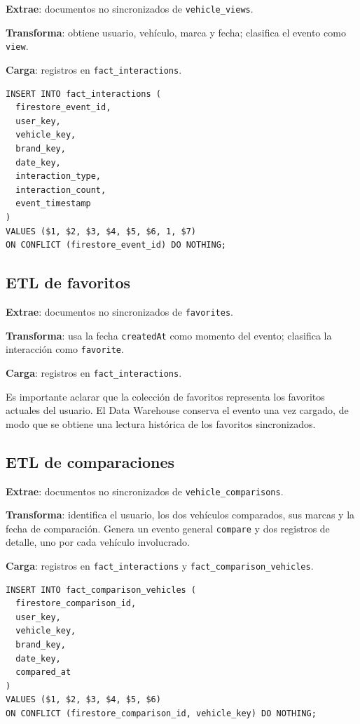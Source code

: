 \documentclass[12pt,letterpaper]{article}
\begin{document}
\textbf{Extrae}: documentos no sincronizados de \texttt{vehicle\_views}.

\textbf{Transforma}: obtiene usuario, vehículo, marca y fecha; clasifica el evento como \texttt{view}.

\textbf{Carga}: registros en \texttt{fact\_interactions}.

\begin{lstlisting}[style=sqlstyle,caption={Carga general de interacciones}]
INSERT INTO fact_interactions (
  firestore_event_id,
  user_key,
  vehicle_key,
  brand_key,
  date_key,
  interaction_type,
  interaction_count,
  event_timestamp
)
VALUES ($1, $2, $3, $4, $5, $6, 1, $7)
ON CONFLICT (firestore_event_id) DO NOTHING;
\end{lstlisting}

\subsection{ETL de favoritos}

\textbf{Extrae}: documentos no sincronizados de \texttt{favorites}.

\textbf{Transforma}: usa la fecha \texttt{createdAt} como momento del evento; clasifica la interacción como \texttt{favorite}.

\textbf{Carga}: registros en \texttt{fact\_interactions}.

Es importante aclarar que la colección de favoritos representa los favoritos actuales del usuario. El Data Warehouse conserva el evento una vez cargado, de modo que se obtiene una lectura histórica de los favoritos sincronizados.

\subsection{ETL de comparaciones}

\textbf{Extrae}: documentos no sincronizados de \texttt{vehicle\_comparisons}.

\textbf{Transforma}: identifica el usuario, los dos vehículos comparados, sus marcas y la fecha de comparación. Genera un evento general \texttt{compare} y dos registros de detalle, uno por cada vehículo involucrado.

\textbf{Carga}: registros en \texttt{fact\_interactions} y \texttt{fact\_comparison\_vehicles}.

\begin{lstlisting}[style=sqlstyle,caption={Detalle de vehículos comparados}]
INSERT INTO fact_comparison_vehicles (
  firestore_comparison_id,
  user_key,
  vehicle_key,
  brand_key,
  date_key,
  compared_at
)
VALUES ($1, $2, $3, $4, $5, $6)
ON CONFLICT (firestore_comparison_id, vehicle_key) DO NOTHING;
\end{lstlisting}
\end{document}
